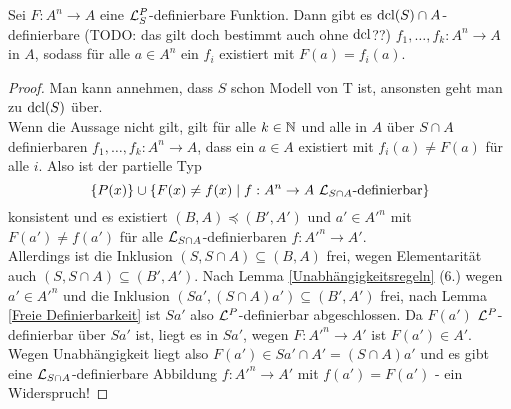 \begin{lemma}
	Sei $F:A^n\rightarrow A$ eine $\mathcal{L}^P_S$-definierbare Funktion. Dann gibt es $\operatorname{dcl}(S)\cap A$-definierbare (TODO: das gilt doch bestimmt auch ohne $\operatorname{dcl}$??) $f_1,\dots,f_k:A^n\rightarrow A$ in $A$, sodass für alle $a\in A^n$ ein $f_i$ existiert mit $F(a)=f_i(a)$.
\end{lemma}
\begin{proof}
	Man kann annehmen, dass $S$ schon Modell von T ist, ansonsten geht man zu $\operatorname{dcl}(S)$ über.\\
	Wenn die Aussage nicht gilt, gilt für alle $k\in\mathbb{N}$ und alle in $A$ über $S\cap A$ definierbaren $f_1,\dots,f_k:A^n\rightarrow A$, dass ein $a\in A$ existiert mit $f_i(a)\neq F(a)$ für alle $i$. Also ist der partielle Typ $$\{P(x)\}\cup\{F(x)\neq f(x)\mid f:A^n\rightarrow A\ \mathcal{L}_{S\cap A}\text{-definierbar}\}$$ konsistent und es existiert $(B,A)\preceq(B',A')$ und $a'\in A'^n$ mit $F(a')\neq f(a')$ für alle $\mathcal{L}_{S\cap A}$-definierbaren $f:A'^n\rightarrow A'$.\\
	Allerdings ist die Inklusion $(S,S\cap A)\subseteq (B,A)$ frei, wegen Elementarität auch $(S,S\cap A)\subseteq (B',A')$. Nach Lemma \ref{Unabhängigkeitsregeln} (6.) wegen $a'\in A'^n$ und die Inklusion $(Sa',(S\cap A)a')\subseteq(B',A')$ frei, nach Lemma \ref{Freie Definierbarkeit} ist $Sa'$ also $\mathcal{L}^P$-definierbar abgeschlossen. Da $F(a')$ $\mathcal{L}^P$-definierbar über $Sa'$ ist, liegt es in $Sa'$, wegen $F:A'^n\rightarrow A'$ ist $F(a')\in A'$. Wegen Unabhängigkeit liegt also $F(a')\in Sa'\cap A'=(S\cap A)a'$ und es gibt eine $\mathcal{L}_{S\cap A}$-definierbare Abbildung $f:A'^n\rightarrow A'$ mit $f(a')=F(a')$ - ein Widerspruch!
\end{proof}

